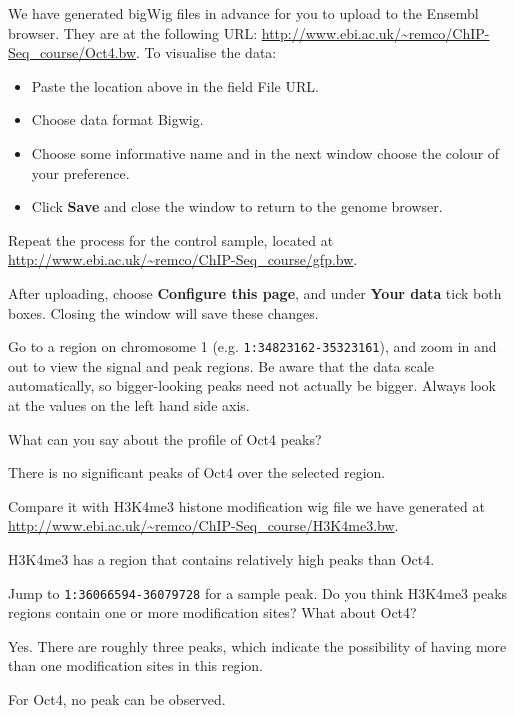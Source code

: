 \begin{steps}
We have generated bigWig files in advance for you to upload to the Ensembl
browser. They are at the following URL:
\url{http://www.ebi.ac.uk/~remco/ChIP-Seq_course/Oct4.bw}. To visualise the
data:
\begin{itemize}
	\item Paste the location above in the field File URL. 
	\item Choose data format Bigwig. 
	\item Choose some informative name and in the next window choose the colour of your preference. 
	\item Click \textbf{Save} and close the window to return to the genome browser. 
\end{itemize}
Repeat the process for the control sample, located at
\url{http://www.ebi.ac.uk/~remco/ChIP-Seq_course/gfp.bw}.
 
After uploading, choose \textbf{Configure this page}, and under \textbf{Your
data} tick both boxes. Closing the window will save these changes.

Go to a region on chromosome 1 (e.g. \texttt{1:34823162-35323161}), and zoom in and out
to view the signal and peak regions. Be aware that the data scale automatically,
so bigger-looking peaks need not actually be bigger. Always look at the values
on the left hand side axis.
\end{steps}

\begin{questions}
What can you say about the profile of Oct4 peaks? 
\begin{answer}
There is no significant peaks of Oct4 over the selected region.
\end{answer}

Compare it with H3K4me3 histone modification wig file we have generated at 
\url{http://www.ebi.ac.uk/~remco/ChIP-Seq_course/H3K4me3.bw}. 
\begin{answer}
H3K4me3 has a region that contains relatively high peaks than Oct4. 
\end{answer}

Jump to \texttt{1:36066594-36079728} for a sample peak. Do you think H3K4me3
peaks regions contain one or more modification sites? What about Oct4?
\begin{answer}
Yes. There are roughly three peaks, which indicate the possibility of having more than one modification sites in this region. 

For Oct4, no peak can be observed.
\end{answer}

\end{questions}

